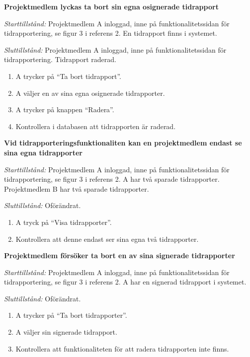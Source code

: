 \documentclass[a4paper]{article}
\begin{document}
\begin{FT}
\item\textbf{Projektmedlem lyckas ta bort sin egna osignerade tidrapport}

\emph{Starttillstånd:} Projektmedlem A inloggad, inne på funktionalitetssidan för tidrapportering, se figur 3 i referens 2. En tidrapport finns i systemet.

\emph{Sluttillstånd:} Projektmedlem A inloggad, inne på funktionalitetssidan för tidrapportering. Tidrapport raderad.

\begin{enumerate}
\item A trycker på ``Ta bort tidrapport''.
\item A väljer en av sina egna osignerade tidrapporter.
\item A trycker på knappen ``Radera''.
\item Kontrollera i databasen att tidrapporten är raderad.
\end{enumerate}


\item
\textbf{Vid tidrapporteringsfunktionaliten kan en projektmedlem endast se sina egna tidrapporter} 

\emph{Starttillstånd:} Projektmedlem A inloggad, inne på funktionalitetssidan för tidrapportering, se figur 3 i referens 2. A har två sparade tidrapporter. Projektmedlem B har två sparade tidrapporter.

\emph{Sluttillstånd:} Oförändrat.

\begin{enumerate}
\item A tryck på ``Visa tidrapporter''.
\item Kontrollera att denne endast ser sina egna två tidrapporter.
\end{enumerate}


\item
\textbf{Projektmedlem försöker ta bort en av sina signerade tidrapporter}

\emph{Starttillstånd:} Projektmedlem A inloggad, inne på funktionalitetssidan för tidrapportering, se figur 3 i referens 2. A har en signerad tidrapport i systemet.

\emph{Sluttillstånd:} Oförändrat.

\begin{enumerate}
\item A trycker på ``Ta bort tidrapporter''.
\item A väljer sin signerade tidrapport.
\item Kontrollera att funktionaliteten för att radera tidrapporten inte finns.
\end{enumerate}


\end{FT}
\end{document}

